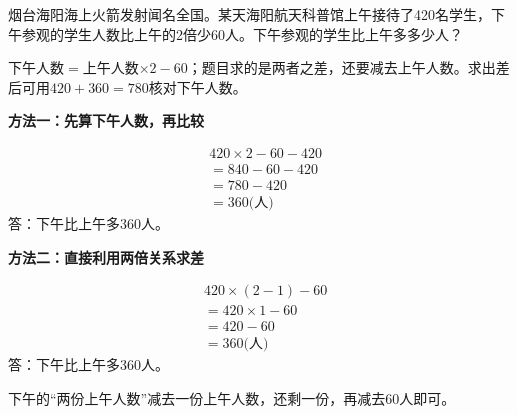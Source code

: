 烟台海阳海上火箭发射闻名全国。某天海阳航天科普馆上午接待了420名学生，下午参观的学生人数比上午的2倍少60人。下午参观的学生比上午多多少人？\par
\begin{BookAnswer}
下午人数\(=\)上午人数\(\times2-60\)；题目求的是两者之差，还要减去上午人数。求出差后可用\(420+360=780\)核对下午人数。\par \par\noindent\begin{minipage}{\linewidth}\textbf{方法一：先算下午人数，再比较}\par \[\begin{aligned}&420\times2-60-420\\&=840-60-420\\&=780-420\\&=360\text{(人)}\end{aligned}\]答：下午比上午多\(360\)人。\end{minipage}\par \par \par\noindent\begin{minipage}{\linewidth}\textbf{方法二：直接利用两倍关系求差}\par \[\begin{aligned}&420\times(2-1)-60\\&=420\times1-60\\&=420-60\\&=360\text{(人)}\end{aligned}\]答：下午比上午多\(360\)人。\end{minipage}\par 下午的“两份上午人数”减去一份上午人数，还剩一份，再减去\(60\)人即可。
\end{BookAnswer}

